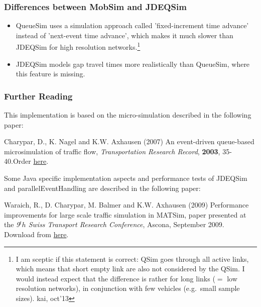 \subsubsection{Differences between MobSim and JDEQSim}
\begin{itemize}
	\item QueueSim  uses a simulation approach called 'fixed-increment time advance'  instead of 'next-event time advance', which makes it much slower than  JDEQSim for high resolution networks.\footnote{%
%
I am sceptic if this statement is correct: QSim goes through all active links, which means that short empty link are also not considered by the QSim.  I would instead expect that the difference is rather for long links ($=$ low resolution networks), in conjunction with few vehicles (e.g.\ small sample sizes). kai, oct'13
%
}
%
	\item JDEQSim models gap travel times more realistically than QueueSim, where this feature is missing.
\end{itemize}




\subsubsection{Further Reading}

This implementation is based on the micro-simulation described in the following paper:

Charypar, D., K. Nagel and K.W. Axhausen (2007) An event-driven queue-based microsimulation of traffic flow, \emph{Transportation Research Record}, \textbf{2003}, 35-40.Order \href{http://trb.metapress.com/content/j2118065485r4611/?p=4f63e25a261d48d99eeebea19b494e24&amp;pi=0}{here}.

Some  Java specific implementation aspects and performance tests of JDEQSim  and parallelEventHandling are described in the following paper:

Waraich,  R., D. Charypar, M. Balmer and K.W. Axhausen (2009) Performance  improvements for large scale traffic simulation in MATSim, paper  presented at the \emph{9$^th$ Swiss Transport Research Conference}, Ascona, September 2009. Download from \href{http://www.ivt.ethz.ch/vpl/publications/reports/ab565.pdf}{here}.

